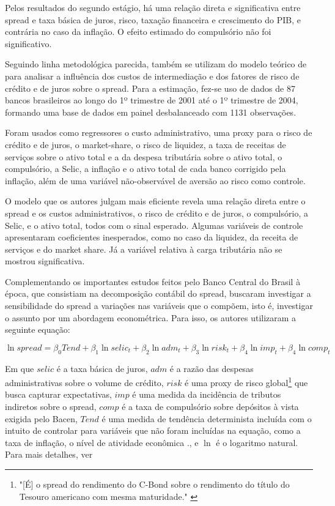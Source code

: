 \documentclass[a4paper,
               article,
               12pt,
               openany,
               oneside,
               english,
               brazil]{abntex2}
\numberwithin{equation}{section}
\begin{document}
    Pelos resultados do segundo estágio, há uma relação direta e significativa entre spread e taxa básica de juros, risco, taxação financeira e crescimento do PIB, e contrária no caso da inflação. O efeito estimado do compulsório não foi significativo.

    Seguindo linha metodológica parecida, \textcite{bignotto06} também se utilizam do modelo teórico de \textcite{hoesaunders} para analisar a influência dos custos de intermediação e dos fatores de risco de crédito e de juros sobre o spread. Para a estimação, fez-se uso de dados de 87 bancos brasileiros ao longo do 1º trimestre de 2001 até o 1º trimestre de 2004, formando uma base de dados em painel desbalanceado com 1131 observações.
    
    Foram usados como regressores o custo administrativo, uma proxy para o risco de crédito e de juros, o market-share, o risco de liquidez, a taxa de receitas de serviços sobre o ativo total e a da despesa tributária sobre o ativo total, o compulsório, a Selic, a inflação e o ativo total de cada banco corrigido pela inflação, além de uma variável não-observável de aversão ao risco como controle. 
    
    O modelo que os autores julgam mais eficiente revela uma relação direta entre o spread e os custos administrativos, o risco de crédito e de juros, o compulsório, a Selic, e o ativo total, todos com o sinal esperado. Algumas variáveis de controle apresentaram coeficientes inesperados, como no caso da liquidez, da receita de serviços e do market share. Já a variável relativa à carga tributária não se mostrou significativa.

    Complementando os importantes estudos feitos pelo Banco Central do Brasil à época, que consistiam na decomposição contábil do spread, \textcite{nakane02} buscaram investigar a sensibilidade do spread a variações nas variáveis que o compõem, isto é, investigar o assunto por um abordagem econométrica. Para isso, os autores utilizaram a seguinte equação:

    $$\ln spread = \beta_0Tend + \beta_1\ln selic_t + \beta_2\ln adm_t + \beta_3\ln risk_t + \beta_4\ln imp_t + \beta_4\ln comp_t$$

    Em que $ selic $ é a taxa básica de juros, $ adm $ é a razão das despesas administrativas sobre o volume de crédito, $ risk $ é uma proxy de risco global\footnote{"[É] o spread do rendimento do C-Bond sobre o rendimento do título do Tesouro americano com mesma maturidade." \cite[p.~10]{nakane02}} que busca capturar expectativas, $ imp $ é uma medida da incidência de tributos indiretos sobre o spread, $ comp $ é a taxa de compulsório sobre depósitos à vista exigida pelo Bacen, $ Tend $ é uma medida de tendência determinista incluída com o intuito de controlar para variáveis que não foram incluídas na equação, como a taxa de inflação, o nível de atividade econômica \etc., e $\ln$ é o logaritmo natural. Para mais detalhes, ver \textcite[10]{nakane02}
\end{document}
